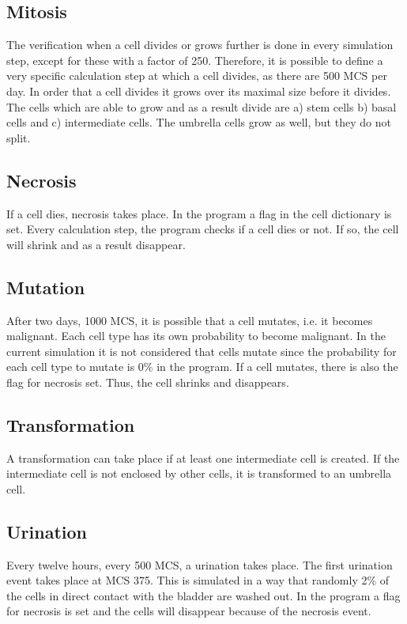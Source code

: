 \subsection{Mitosis}
The verification when a cell divides or grows further is done in every simulation step, except for these with a factor of 250. Therefore, it is possible to define a very specific calculation step at which a cell divides, as there are 500 \ac{MCS} per day. In order that a cell divides it grows over its maximal size before it divides.
The cells which are able to grow and as a result divide are a) stem cells b) basal cells and c) intermediate cells. The umbrella cells grow as well, but they do not split.

\subsection{Necrosis}
If a cell dies, necrosis takes place. In the program a flag in the cell dictionary is set. Every calculation step, the program checks if a cell dies or not. If so, the cell will shrink and as a result disappear.

\subsection{Mutation}
After two days, 1000 \ac{MCS}, it is possible that a cell mutates, i.e. it becomes malignant. Each cell type has its own probability to become malignant. In the current simulation it is not considered that cells mutate since the probability for each cell type to mutate is 0\% in the program. \newline
If a cell mutates, there is also the flag for necrosis set. Thus, the cell shrinks and disappears.

\subsection{Transformation}
A transformation can take place if at least one intermediate cell is created. If the intermediate cell is not enclosed by other cells, it is transformed to an umbrella cell.

\subsection{Urination}
Every twelve hours, every 500 \ac{MCS}, a urination takes place. The first urination event takes place at \ac{MCS} 375. This is simulated in a way that randomly 2\% of the cells in direct contact with the bladder are washed out. In the program a flag for necrosis is set and the cells will disappear because of the necrosis event.



